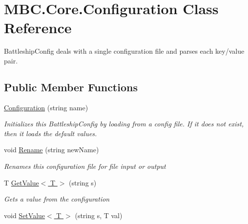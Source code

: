 \hypertarget{class_m_b_c_1_1_core_1_1_configuration}{\section{M\-B\-C.\-Core.\-Configuration Class Reference}
\label{class_m_b_c_1_1_core_1_1_configuration}
}


Battleship\-Config deals with a single configuration file and parses each key/value pair. 


\subsection*{Public Member Functions}
\begin{DoxyCompactItemize}
\item 
\hypertarget{class_m_b_c_1_1_core_1_1_configuration_aa0551a9f6fc9d76aa2300da55f6ea135}{\hyperlink{class_m_b_c_1_1_core_1_1_configuration_aa0551a9f6fc9d76aa2300da55f6ea135}{Configuration} (string name)}\label{class_m_b_c_1_1_core_1_1_configuration_aa0551a9f6fc9d76aa2300da55f6ea135}

\begin{DoxyCompactList}\small\item\em Initializes this Battleship\-Config by loading from a config file. If it does not exist, then it loads the default values.\end{DoxyCompactList}\item 
\hypertarget{class_m_b_c_1_1_core_1_1_configuration_a7fd9b75ad6dcea3175cd25e4afe9f59e}{void \hyperlink{class_m_b_c_1_1_core_1_1_configuration_a7fd9b75ad6dcea3175cd25e4afe9f59e}{Rename} (string new\-Name)}\label{class_m_b_c_1_1_core_1_1_configuration_a7fd9b75ad6dcea3175cd25e4afe9f59e}

\begin{DoxyCompactList}\small\item\em Renames this configuration file for file input or output\end{DoxyCompactList}\item 
T \hyperlink{class_m_b_c_1_1_core_1_1_configuration_addce147239dffada4ca7bb0c8a0b7522}{Get\-Value$<$ T $>$} (string s)
\begin{DoxyCompactList}\small\item\em Gets a value from the configuration\end{DoxyCompactList}\item 
\hypertarget{class_m_b_c_1_1_core_1_1_configuration_a4f161db0d533cac5ddbf558fa2aaea3b}{void \hyperlink{class_m_b_c_1_1_core_1_1_configuration_a4f161db0d533cac5ddbf558fa2aaea3b}{Set\-Value$<$ T $>$} (string s, T val)}\label{class_m_b_c_1_1_core_1_1_configuration_a4f161db0d533cac5ddbf558fa2aaea3b}


\end{DoxyCompactItemize}
